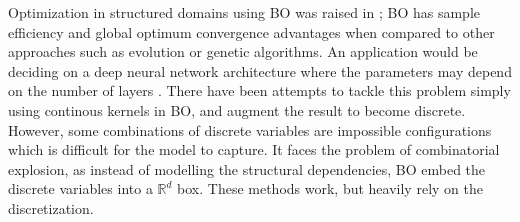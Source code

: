 \documentclass[
    american,a4paper
    ]{scrartcl}
\newcommand{\lang}{en}
\begin{document}
\begin{description}[style=unboxed]
            \item [\questionTwo{\lang}]
                Optimization in structured domains using BO was raised in \cite{NeurIPS2017};
                BO has sample efficiency and global optimum convergence advantages when compared to other approaches such as evolution or genetic algorithms.
                An application would be deciding on a deep neural network architecture where the parameters may depend on the number of layers \cite{bengio2009learning}.
                There have been attempts to tackle this problem simply using continous kernels in BO, and augment the result to become discrete.
                However, some combinations of discrete variables are impossible configurations which is difficult for the model to capture.
                It faces the problem of combinatorial explosion, as instead of modelling the structural dependencies, 
                BO embed the discrete variables into a $\mathbb{R}^d$ box.
                These methods work, but heavily rely on the discretization.


\end{description}
\end{document}
